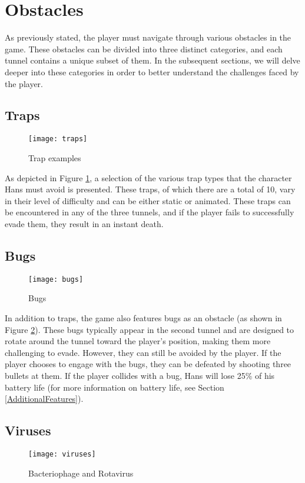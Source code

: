 \section{Obstacles}
As previously stated, the player must navigate through various obstacles in the game. These obstacles can be divided into three distinct categories, and each tunnel contains a unique subset of them. In the subsequent sections, we will delve deeper into these categories in order to better understand the challenges faced by the player.

\subsection{Traps}
\begin{figure}[h]
    \centering
    \texttt{[image: traps]}
    \caption{Trap examples}
    \label{fig:traps}
\end{figure}
As depicted in Figure \ref{fig:traps}, a selection of the various trap types that the character Hans must avoid is presented. These traps, of which there are a total of 10, vary in their level of difficulty and can be either static or animated. These traps can be encountered in any of the three tunnels, and if the player fails to successfully evade them, they result in an instant death.

\subsection{Bugs}
\label{Bugs}
\begin{figure}[h]
    \centering
    \texttt{[image: bugs]}
    \caption{Bugs}
    \label{fig:bugs}
\end{figure}
In addition to traps, the game also features bugs as an obstacle (as shown in Figure \ref{fig:bugs}). These bugs typically appear in the second tunnel and are designed to rotate around the tunnel toward the player's position, making them more challenging to evade. However, they can still be avoided by the player. If the player chooses to engage with the bugs, they can be defeated by shooting three bullets at them. If the player collides with a bug, Hans will lose 25\% of his battery life (for more information on battery life, see Section \ref{AdditionalFeatures}).

\subsection{Viruses}
\begin{figure}[h]
    \centering
    \texttt{[image: viruses]}
    \caption{Bacteriophage and Rotavirus}
    \label{fig:viruses}
\end{figure}

